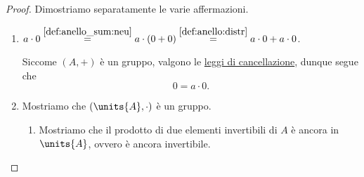 \begin{proof}
    Dimostriamo separatamente le varie affermazioni.
    \begin{enumerate}[label={(\roman*)}]
        \item $a \cdot 0 \stackrel{\ref{def:anello_sum:neu}}{=} a \cdot (0 + 0) \stackrel{\ref{def:anello:distr}}{=} a \cdot 0 + a \cdot 0$.
        
        Siccome $(A, +)$ è un gruppo, valgono le \hyperref[prop:prop_grp:canc]{leggi di cancellazione}, dunque segue che \[
            0 = a \cdot 0.    
        \]
        \item Mostriamo che $(\units{A}, \cdot)$ è un gruppo.
        \begin{enumerate}[label={(G\arabic*)}]
            \item Mostriamo che il prodotto di due elementi invertibili di $A$ è ancora in $\units{A}$, ovvero è ancora invertibile.
            

\end{enumerate}
\end{enumerate}
\end{proof}
